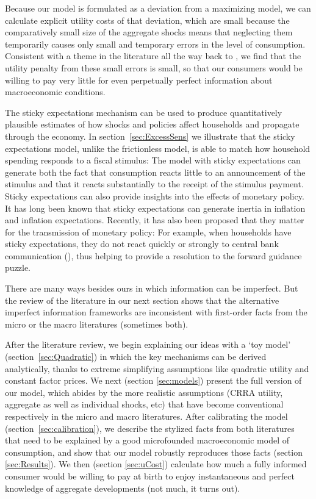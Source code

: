 \documentclass[titlepage]{./econtex}
\begin{document}
Because our model is formulated as a deviation from a maximizing model, we can calculate explicit utility costs of that deviation, which are small because the comparatively small size of the aggregate shocks means that neglecting them temporarily causes only small and temporary errors in the level of consumption.  Consistent with a theme in the literature all the way back to \cite{ayNearRational}, we find that the utility penalty from these small errors is small, so that our consumers would be willing to pay very little for even perpetually perfect information about macroeconomic conditions.

The sticky expectations mechanism can be used to produce quantitatively plausible estimates of how shocks and policies affect households and propagate through the economy. In section~\ref{sec:ExcessSens} we illustrate that the sticky expectations model, unlike the frictionless model, is able to match how household spending responds to a fiscal stimulus: The model with sticky expectations can generate both the fact that consumption reacts little to an announcement of the stimulus and that it reacts substantially to the receipt of the stimulus payment. Sticky expectations can also provide insights into the effects of monetary policy. It has long been known that sticky expectations can generate inertia in inflation and inflation expectations. Recently, it has also been proposed that they matter for the transmission of monetary policy: For example, when households have sticky expectations, they do not react quickly or strongly to central bank communication (\cite{arsInvestmentInattention}), thus helping to provide a resolution to the forward guidance puzzle.

There are many ways besides ours in which information can be imperfect.  But the review of the literature in our next section shows that the alternative imperfect information frameworks are inconsistent with first-order facts from the micro or the macro literatures (sometimes both).

After the literature review, we begin explaining our ideas with a `toy model' (section~\ref{sec:Quadratic}) in which the key mechanisms can be derived analytically, thanks to extreme simplifying assumptions like quadratic utility and constant factor prices.  We next (section \ref{sec:models}) present the full version of our model, which abides by the more realistic assumptions (CRRA utility, aggregate as well as individual shocks, etc) that have become conventional respectively in the micro and macro literatures. After calibrating the model (section~\ref{sec:calibration}), we describe the stylized facts from both literatures that need to be explained by a good microfounded macroeconomic model of consumption, and show that our model robustly reproduces those facts (section \ref{sec:Results}).
We then (section \ref{sec:uCost}) calculate how much a fully informed consumer would be willing to pay at birth to enjoy instantaneous and perfect knowledge of aggregate developments (not much, it turns out).
\end{document}
